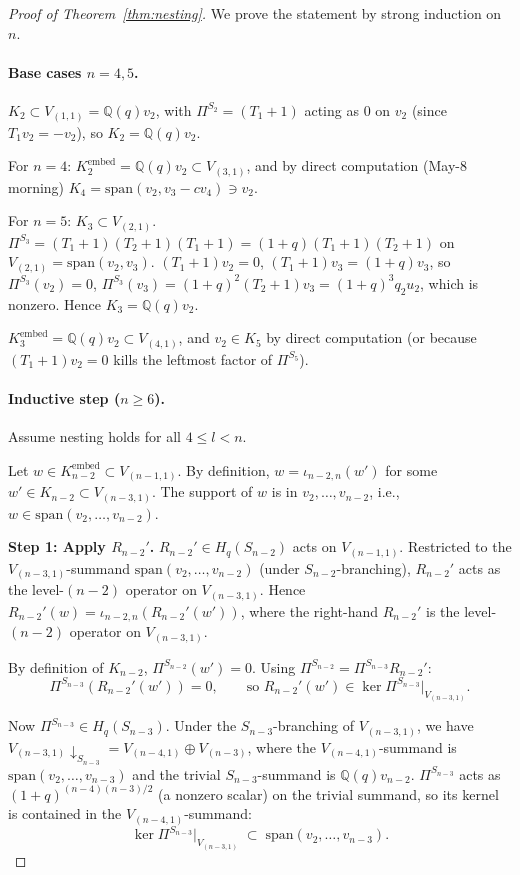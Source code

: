 \documentclass[11pt]{article}
\theoremstyle{definition}
\begin{document}
\begin{proof}[Proof of Theorem~\ref{thm:nesting}]
We prove the statement by strong induction on $n$.

\paragraph{Base cases $n = 4, 5$.}
$K_2 \subset V_{(1,1)} = \mathbb{Q}(q) v_2$, with
$\Pi^{S_2} = (T_1+1)$ acting as $0$ on $v_2$
(since $T_1 v_2 = -v_2$), so $K_2 = \mathbb{Q}(q) v_2$.

For $n = 4$: $K_2^{\mathrm{embed}} = \mathbb{Q}(q) v_2 \subset V_{(3,1)}$,
and by direct computation (May-8 morning) $K_4 = \mathrm{span}(v_2,
v_3 - cv_4) \ni v_2$.

For $n = 5$: $K_3 \subset V_{(2,1)}$. $\Pi^{S_3} = (T_1+1)(T_2+1)(T_1+1)
= (1+q)(T_1+1)(T_2+1)$ on $V_{(2,1)} = \mathrm{span}(v_2, v_3)$.
$(T_1+1)v_2 = 0$, $(T_1+1)v_3 = (1+q)v_3$, so $\Pi^{S_3}(v_2) = 0$,
$\Pi^{S_3}(v_3) = (1+q)^2(T_2+1)v_3 = (1+q)^3 q_2 u_2$, which is
nonzero. Hence $K_3 = \mathbb{Q}(q) v_2$.

$K_3^{\mathrm{embed}} = \mathbb{Q}(q) v_2 \subset V_{(4,1)}$, and $v_2 \in K_5$
by direct computation (or because $(T_1+1)v_2 = 0$ kills the
leftmost factor of $\Pi^{S_5}$).

\paragraph{Inductive step ($n \ge 6$).}
Assume nesting holds for all $4 \le l < n$.

Let $w \in K_{n-2}^{\mathrm{embed}} \subset V_{(n-1,1)}$.
By definition, $w = \iota_{n-2,n}(w')$ for some $w' \in K_{n-2}
\subset V_{(n-3,1)}$. The support of $w$ is in $v_2, \ldots, v_{n-2}$,
i.e., $w \in \mathrm{span}(v_2,\ldots,v_{n-2})$.

\textbf{Step 1: Apply $R_{n-2}'$.}
$R_{n-2}' \in H_q(S_{n-2})$ acts on $V_{(n-1,1)}$. Restricted to the
$V_{(n-3,1)}$-summand $\mathrm{span}(v_2,\ldots,v_{n-2})$ (under
$S_{n-2}$-branching), $R_{n-2}'$ acts as the level-$(n-2)$ operator
on $V_{(n-3,1)}$. Hence
$R_{n-2}'(w) = \iota_{n-2,n}(R_{n-2}'(w'))$, where the right-hand
$R_{n-2}'$ is the level-$(n-2)$ operator on $V_{(n-3,1)}$.

By definition of $K_{n-2}$, $\Pi^{S_{n-2}}(w') = 0$. Using
$\Pi^{S_{n-2}} = \Pi^{S_{n-3}} R_{n-2}'$:
\[
   \Pi^{S_{n-3}}(R_{n-2}'(w')) = 0,
   \qquad \text{so } R_{n-2}'(w') \in \ker \Pi^{S_{n-3}}|_{V_{(n-3,1)}}.
\]

Now $\Pi^{S_{n-3}} \in H_q(S_{n-3})$. Under the
$S_{n-3}$-branching of $V_{(n-3,1)}$, we have $V_{(n-3,1)}
\downarrow_{S_{n-3}} = V_{(n-4,1)} \oplus V_{(n-3)}$, where the
$V_{(n-4,1)}$-summand is $\mathrm{span}(v_2,\ldots,v_{n-3})$
and the trivial $S_{n-3}$-summand is $\mathbb{Q}(q) v_{n-2}$.
$\Pi^{S_{n-3}}$ acts as $(1+q)^{(n-4)(n-3)/2}$ (a nonzero scalar) on
the trivial summand, so its kernel is contained in the
$V_{(n-4,1)}$-summand:
\[
   \ker \Pi^{S_{n-3}}|_{V_{(n-3,1)}}
     \;\subset\; \mathrm{span}(v_2,\ldots,v_{n-3}).
\]


\end{proof}
\end{document}
